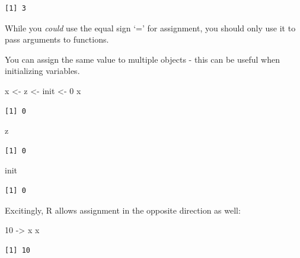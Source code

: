 \documentclass[
]{book}
\newenvironment{Shaded}{\begin{snugshade}}{\end{snugshade}}
\newcommand{\DecValTok}[1]{\textcolor[rgb]{0.00,0.00,0.81}{#1}}
\newcommand{\NormalTok}[1]{#1}
\newcommand{\OtherTok}[1]{\textcolor[rgb]{0.56,0.35,0.01}{#1}}
\begin{document}
\begin{verbatim}
[1] 3
\end{verbatim}

\begin{rmdnote}
While you \emph{could} use the equal sign `=' for assignment, you should
only use it to pass arguments to functions.
\end{rmdnote}

You can assign the same value to multiple objects - this can be useful when initializing variables.

\begin{Shaded}
\begin{Highlighting}[]
\NormalTok{x }\OtherTok{\textless{}{-}}\NormalTok{ z }\OtherTok{\textless{}{-}}\NormalTok{ init }\OtherTok{\textless{}{-}} \DecValTok{0}
\NormalTok{x}
\end{Highlighting}
\end{Shaded}

\begin{verbatim}
[1] 0
\end{verbatim}

\begin{Shaded}
\begin{Highlighting}[]
\NormalTok{z}
\end{Highlighting}
\end{Shaded}

\begin{verbatim}
[1] 0
\end{verbatim}

\begin{Shaded}
\begin{Highlighting}[]
\NormalTok{init}
\end{Highlighting}
\end{Shaded}

\begin{verbatim}
[1] 0
\end{verbatim}

Excitingly, R allows assignment in the opposite direction as well:

\begin{Shaded}
\begin{Highlighting}[]
\DecValTok{10} \OtherTok{{-}\textgreater{}}\NormalTok{ x}
\NormalTok{x}
\end{Highlighting}
\end{Shaded}

\begin{verbatim}
[1] 10
\end{verbatim}
\end{document}
